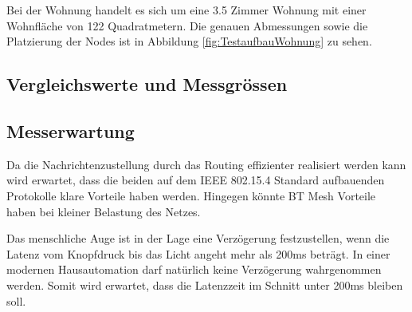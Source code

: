 Bei der Wohnung handelt es sich um eine 3.5 Zimmer Wohnung mit einer Wohnfläche von 122 Quadratmetern. Die genauen Abmessungen sowie die Platzierung der Nodes ist in Abbildung \ref{fig:TestaufbauWohnung} zu sehen.

\vspace{30mm}
\subsection{Vergleichswerte und Messgrössen}\label{subsec:VergleichswerteundMessgrössenMesh}

\subsection{Messerwartung}
Da die Nachrichtenzustellung durch das Routing effizienter realisiert werden kann wird erwartet, dass die beiden auf dem IEEE 802.15.4 Standard aufbauenden Protokolle klare Vorteile haben werden. Hingegen könnte BT Mesh Vorteile haben bei kleiner Belastung des Netzes.

Das menschliche Auge ist in der Lage eine Verzögerung festzustellen, wenn die Latenz vom Knopfdruck bis das Licht angeht mehr als 200ms beträgt. In einer modernen Hausautomation darf natürlich keine Verzögerung wahrgenommen werden. Somit wird erwartet, dass die Latenzzeit im Schnitt unter 200ms bleiben soll. \cite{silicon_laboratories_inc_an1142_2020}